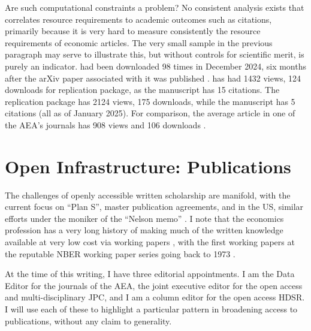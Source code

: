 \documentclass{article}
\begin{document}
Are such computational constraints a problem? No consistent analysis exists that correlates resource requirements to academic outcomes such as citations, primarily because it is very hard to measure consistently the resource requirements of economic articles. The very small sample in the previous paragraph may serve to illustrate this, but without controls for scientific merit, is purely an indicator. \citet{dell_research_harvard_newswire_nodate} had been downloaded 98 times in December 2024, six months after the arXiv paper associated with it was published \citep{silcock_newswire_2024}. \citet{rudik_data_2020} has had  1432 views, 124 downloads for replication package, as the manuscript \citep{rudik_optimal_2020} has 15 citations. The replication package \citet{khachiyan_data_2022} has  2124 views, 175 downloads, while the manuscript \citep{khachiyan_using_2022} has 5 citations (all as of January 2025). For comparison, the average article in one of the \ac{AEA}'s journals has 908 views and 106 downloads \citep[Table 4][]{vilhuber_report_2025}.

%







\section{Open Infrastructure: Publications}
\label{sec:publications}

The challenges of openly accessible written scholarship are manifold, with the current focus on ``Plan S'', master publication agreements, and in the US, similar efforts under the moniker of the ``Nelson memo'' \parencite{brainard_white_2022,brainard_us_2024}. I note that the economics profession has a very long history of making much of the written knowledge available at very low cost via working papers \parencite{vilhuber_reproducibility_2020}, with the first working papers at the reputable NBER working paper series going back to 1973 \parencite{welch_education_1973}.

At the time of this writing, I have three editorial appointments. I am the Data Editor for the journals of the \acf{AEA}, the joint executive editor for the open access and multi-disciplinary \ac{JPC}, and I am a column editor for the open access \ac{HDSR}. I will use each of these to highlight a particular pattern in broadening access to publications, without any claim to generality. 
\end{document}
